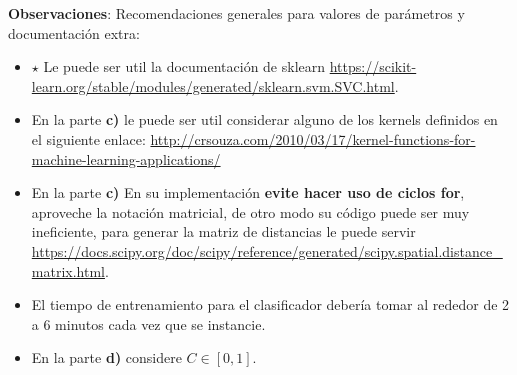 \documentclass[11pt,letterpaper]{article}
\begin{document}
\textbf{Observaciones}: Recomendaciones generales para valores de parámetros y documentación extra:

\begin{itemize}
    \item $\star$ Le puede ser util la documentación de sklearn \url{https://scikit-learn.org/stable/modules/generated/sklearn.svm.SVC.html}.
    \item En la parte \textbf{c)} le puede ser util considerar alguno de los kernels definidos en el siguiente enlace: \url{http://crsouza.com/2010/03/17/kernel-functions-for-machine-learning-applications/}
    \item En la parte \textbf{c)} En su implementación \textbf{evite hacer uso de ciclos for}, aproveche la notación matricial, de otro modo su código puede ser muy ineficiente, para generar la matriz de distancias le puede servir \url{https://docs.scipy.org/doc/scipy/reference/generated/scipy.spatial.distance_matrix.html}.
    \item El tiempo de entrenamiento para el clasificador debería tomar al rededor de 2 a 6 minutos cada vez que se instancie. 
    \item En la parte \textbf{d)} considere $C \in [0,1]$.
\end{itemize}
\end{document}
